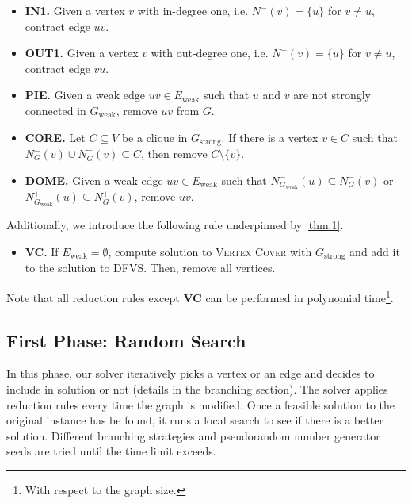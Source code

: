 \documentclass[a4paper,UKenglish,cleveref, autoref, thm-restate]{lipics-v2021}
\begin{document}
\begin{itemize}
    \item \textbf{IN1.} Given a vertex $v$ with in-degree one, i.e. $N^-(v)=\{u\}$ for $v \neq u$,
        contract edge $uv$.
    \item \textbf{OUT1.} Given a vertex $v$ with out-degree one, i.e. $N^+(v)=\{u\}$ for $v \neq u$,
        contract edge $vu$.
    \item \textbf{PIE.} Given a weak edge $uv \in E_\text{weak}$ such that $u$ and $v$ are not strongly connected in $G_\text{weak}$,
        remove $uv$ from $G$.
    \item \textbf{CORE.} Let $C \subseteq V$ be a clique in $G_\text{strong}$.
        If there is a vertex $v \in C$ such that $N_G^-(v) \cup N_G^+(v) \subseteq C$, then
        remove $C \setminus \{v\}$.
    \item \textbf{DOME.} Given a weak edge $uv \in E_\text{weak}$ such that
        $N_{G_\text{weak}}^-(u) \subseteq N_G^-(v)$ or
        $N_{G_\text{weak}}^+(u) \subseteq N_G^+(v)$, remove $uv$.
\end{itemize}

Additionally, we introduce the following rule underpinned by \cref{thm:1}.

\begin{itemize}
    \item \textbf{VC.} If $E_\text{weak} = \emptyset$, compute solution to \textsc{Vertex Cover} with $G_\text{strong}$
    and add it to the solution to \textsc{DFVS}. Then, remove all vertices.
\end{itemize}

Note that all reduction rules except \textbf{VC} can be performed in polynomial time\footnote{With respect to the graph size.}.

%
\subsection{First Phase: Random Search}

In this phase, our solver iteratively picks a vertex or an edge and decides to include in solution or not
(details in the branching section).
The solver applies reduction rules every time the graph is modified.
Once a feasible solution to the original instance has be found, it runs a local search to see
 if there is a better solution.
Different branching strategies and pseudorandom number generator seeds are tried until the time limit exceeds.
\end{document}
